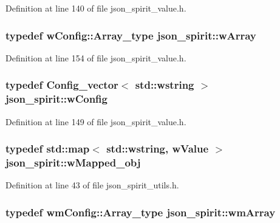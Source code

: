 Definition at line 140 of file json\+\_\+spirit\+\_\+value.\+h.

\hypertarget{namespacejson__spirit_ae12b0f52e988920d99e90df589d1a551}{}
\subsubsection[{w\+Array}]{\setlength{\rightskip}{0pt plus 5cm}typedef {\bf w\+Config\+::\+Array\+\_\+type} {\bf json\+\_\+spirit\+::w\+Array}}\label{namespacejson__spirit_ae12b0f52e988920d99e90df589d1a551}


Definition at line 154 of file json\+\_\+spirit\+\_\+value.\+h.

\hypertarget{namespacejson__spirit_ac076d3c2bcc063f3654a053b63ee9268}{}
\subsubsection[{w\+Config}]{\setlength{\rightskip}{0pt plus 5cm}typedef {\bf Config\+\_\+vector}$<$ std\+::wstring $>$ {\bf json\+\_\+spirit\+::w\+Config}}\label{namespacejson__spirit_ac076d3c2bcc063f3654a053b63ee9268}


Definition at line 149 of file json\+\_\+spirit\+\_\+value.\+h.

\hypertarget{namespacejson__spirit_a4cc7fea4369942dbce7b920fe9d62eab}{}
\subsubsection[{w\+Mapped\+\_\+obj}]{\setlength{\rightskip}{0pt plus 5cm}typedef std\+::map$<$ std\+::wstring, {\bf w\+Value} $>$ {\bf json\+\_\+spirit\+::w\+Mapped\+\_\+obj}}\label{namespacejson__spirit_a4cc7fea4369942dbce7b920fe9d62eab}


Definition at line 43 of file json\+\_\+spirit\+\_\+utils.\+h.

\hypertarget{namespacejson__spirit_a189949a59336840dc8c8d844453a3cd5}{}
\subsubsection[{wm\+Array}]{\setlength{\rightskip}{0pt plus 5cm}typedef {\bf wm\+Config\+::\+Array\+\_\+type} {\bf json\+\_\+spirit\+::wm\+Array}}\label{namespacejson__spirit_a189949a59336840dc8c8d844453a3cd5}


